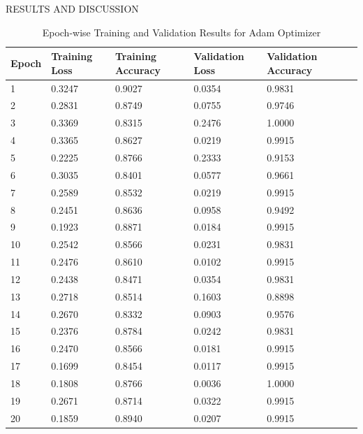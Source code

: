 \begin{section}[]{\uppercase{Results and Discussion}}
\begin{table}[htbp]
    \centering
    \begin{tabular}{llllll}
    \toprule
    \textbf{Epoch} & \textbf{Training Loss} & \textbf{Training Accuracy} & \textbf{Validation Loss} & \textbf{Validation Accuracy} \\ 
    \midrule
    1  & 0.3247 & 0.9027 & 0.0354 & 0.9831 \\ 
    \midrule
    2  & 0.2831 & 0.8749 & 0.0755 & 0.9746 \\ 
    \midrule
    3  & 0.3369 & 0.8315 & 0.2476 & 1.0000 \\ 
    \midrule
    4  & 0.3365 & 0.8627 & 0.0219 & 0.9915 \\ 
    \midrule
    5  & 0.2225 & 0.8766 & 0.2333 & 0.9153 \\ 
    \midrule
    6  & 0.3035 & 0.8401 & 0.0577 & 0.9661 \\ 
    \midrule
    7  & 0.2589 & 0.8532 & 0.0219 & 0.9915 \\ 
    \midrule
    8  & 0.2451 & 0.8636 & 0.0958 & 0.9492 \\ 
    \midrule
    9  & 0.1923 & 0.8871 & 0.0184 & 0.9915 \\ 
    \midrule
    10 & 0.2542 & 0.8566 & 0.0231 & 0.9831 \\ 
    \midrule
    11 & 0.2476 & 0.8610 & 0.0102 & 0.9915 \\ 
    \midrule
    12 & 0.2438 & 0.8471 & 0.0354 & 0.9831 \\ 
    \midrule
    13 & 0.2718 & 0.8514 & 0.1603 & 0.8898 \\ 
    \midrule
    14 & 0.2670 & 0.8332 & 0.0903 & 0.9576 \\ 
    \midrule
    15 & 0.2376 & 0.8784 & 0.0242 & 0.9831 \\ 
    \midrule
    16 & 0.2470 & 0.8566 & 0.0181 & 0.9915 \\ 
    \midrule
    17 & 0.1699 & 0.8454 & 0.0117 & 0.9915 \\ 
    \midrule
    18 & 0.1808 & 0.8766 & 0.0036 & 1.0000 \\ 
    \midrule
    19 & 0.2671 & 0.8714 & 0.0322 & 0.9915 \\ 
    \midrule
    20 & 0.1859 & 0.8940 & 0.0207 & 0.9915 \\ 
    \bottomrule
    \end{tabular}
    \caption{Epoch-wise Training and Validation Results for Adam Optimizer}
    \label{table:results-a}
    \end{table}
 

\end{section}
